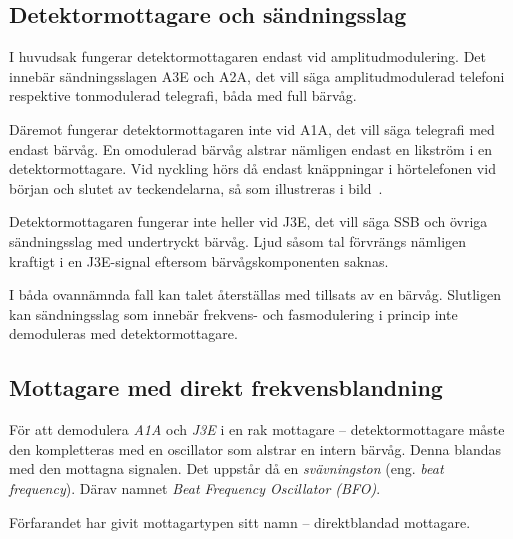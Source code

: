 
\subsection{Detektormottagare och sändningsslag}

I huvudsak fungerar detektormottagaren endast vid amplitudmodulering.
Det innebär sändningsslagen A3E och A2A, det vill säga amplitudmodulerad
telefoni respektive tonmodulerad telegrafi, båda med full bärvåg.

Däremot fungerar detektormottagaren inte vid A1A, det vill säga telegrafi med
endast bärvåg.
En omodulerad bärvåg alstrar nämligen endast en likström i en
detektormottagare.
Vid nyckling hörs då endast knäppningar i hörtelefonen vid början och
slutet av teckendelarna, så som illustreras i bild~.

Detektormottagaren fungerar inte heller vid J3E, det vill säga SSB och övriga
sändningsslag med undertryckt bärvåg.
Ljud såsom tal förvrängs nämligen kraftigt i en J3E-signal eftersom
bärvågskomponenten saknas.

I båda ovannämnda fall kan talet återställas med tillsats av en bärvåg.
Slutligen kan sändningsslag som innebär frekvens- och fasmodulering i
princip inte demoduleras med detektormottagare.


\subsection{Mottagare med direkt frekvensblandning}

För att demodulera \emph{A1A} och \emph{J3E} i en rak mottagare --
detektormottagare måste den kompletteras med en oscillator som alstrar en
intern bärvåg.
Denna blandas med den mottagna signalen.
Det uppstår då en \emph{svävningston} (eng. \emph{beat frequency}).
Därav namnet \emph{Beat Frequency Oscillator (BFO)}.

Förfarandet har givit mottagartypen sitt namn -- direktblandad mottagare.

